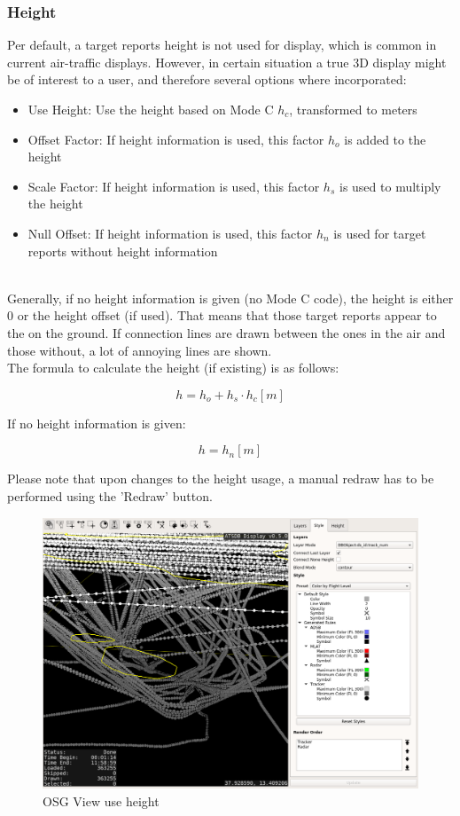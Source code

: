 \subsubsection{Height}
\label{sec:others_height}

Per default, a target reports height is not used for display, which is common in current air-traffic displays. However, in certain situation a true 3D display might be of interest to a user, and therefore several options where incorporated:

\begin{itemize}
 \item Use Height: Use the height based on Mode C $h_c$, transformed to meters
 \item Offset Factor: If height information is used, this factor $h_o$ is added to the height
 \item Scale Factor: If height information is used, this factor $h_s$ is used to multiply the height
 \item Null Offset: If height information is used, this factor $h_n$ is used for target reports without height information
\end{itemize}
\ \\

Generally, if no height information is given (no Mode C code), the height is either $0$ or the height offset (if used). That means that those target reports appear to the on the ground. If connection lines are drawn between the ones in the air and those without, a lot of annoying lines are shown. \\

The formula to calculate the height (if existing) is as follows: 

$$ h = h_o + h_s \cdot h_c [m]$$ 

If no height information is given:

$$ h = h_n [m]$$ 

Please note that upon changes to the height usage, a manual redraw has to be performed using the 'Redraw' button.


\begin{figure}[H]
    \hspace*{-2.5cm}
    \includegraphics[width=19cm,frame]{figures/osgview_use_height.png}
  \caption{OSG View use height}
\end{figure} 

